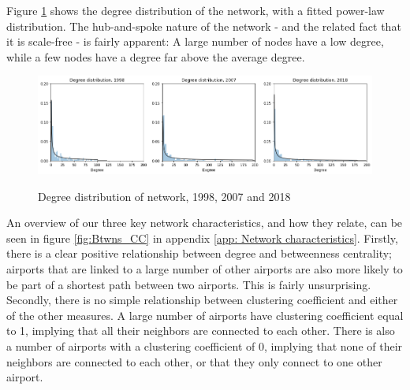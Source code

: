 Figure \ref{fig:degree_distribution} shows the degree distribution of the network, with a fitted power-law distribution. The hub-and-spoke nature of the network - and the related fact that it is scale-free - is fairly apparent: A large number of nodes have a low degree, while a few nodes have a degree far above the average degree. 
\begin{figure}[H]
  \centering
  \caption{Degree distribution of network, 1998, 2007 and 2018}
    \includegraphics[width=1 \textwidth]{Exam/Figures/degree_distributionv2.png}
  \label{fig:degree_distribution}
\end{figure}
An overview of our three key network characteristics, and how they relate, can be seen in figure \ref{fig:Btwns_CC} in appendix \ref{app: Network characteristics}. Firstly, there is a clear positive relationship between degree and betweenness centrality; airports that are linked to a large number of other airports are also more likely to be part of a shortest path between two airports. This is fairly unsurprising. Secondly, there is no simple relationship between clustering coefficient and either of the other measures. A large number of airports have clustering coefficient equal to 1, implying that all their neighbors are connected to each other. There is also a number of airports with a clustering coefficient of 0, implying that none of their neighbors are connected to each other, or that they only connect to one other airport. 


